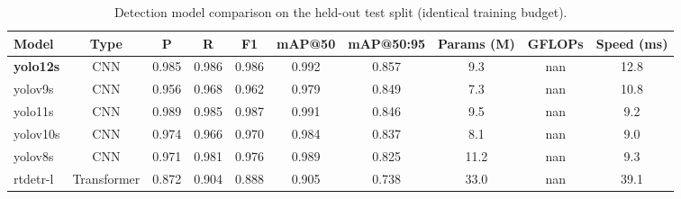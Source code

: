 \begin{table}[t]
\centering
\caption{Detection model comparison on the held-out test split (identical training budget).}
\label{tab:det_compare}
\begin{tabular}{lccccccccc}
\toprule
Model & Type & P & R & F1 & mAP@50 & mAP@50:95 & Params (M) & GFLOPs & Speed (ms) \\
\midrule
\textbf{yolo12s} & CNN & 0.985 & 0.986 & 0.986 & 0.992 & 0.857 & 9.3 & nan & 12.8 \\
yolov9s & CNN & 0.956 & 0.968 & 0.962 & 0.979 & 0.849 & 7.3 & nan & 10.8 \\
yolo11s & CNN & 0.989 & 0.985 & 0.987 & 0.991 & 0.846 & 9.5 & nan & 9.2 \\
yolov10s & CNN & 0.974 & 0.966 & 0.970 & 0.984 & 0.837 & 8.1 & nan & 9.0 \\
yolov8s & CNN & 0.971 & 0.981 & 0.976 & 0.989 & 0.825 & 11.2 & nan & 9.3 \\
rtdetr-l & Transformer & 0.872 & 0.904 & 0.888 & 0.905 & 0.738 & 33.0 & nan & 39.1 \\
\bottomrule
\end{tabular}
\end{table}